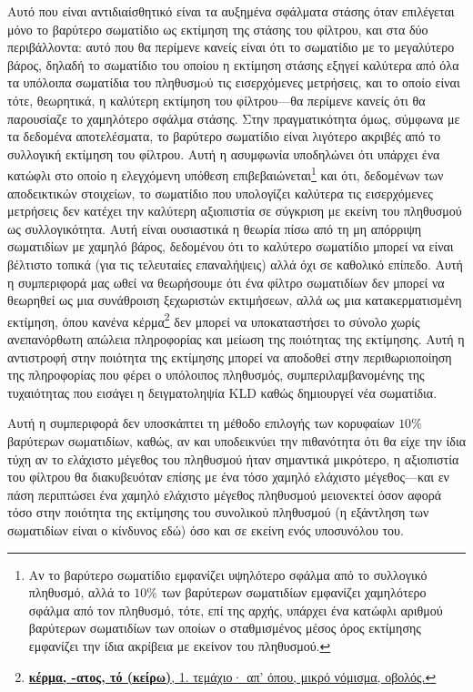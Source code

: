 Αυτό που είναι αντιδιαίσθητικό είναι τα αυξημένα σφάλματα στάσης όταν
επιλέγεται μόνο το βαρύτερο σωματίδιο ως εκτίμηση της στάσης του φίλτρου, και
στα δύο περιβάλλοντα: αυτό που θα περίμενε κανείς είναι ότι το σωματίδιο με το
μεγαλύτερο βάρος, δηλαδή το σωματίδιο του οποίου η εκτίμηση στάσης εξηγεί
καλύτερα από όλα τα υπόλοιπα σωματίδια του πληθυσμoύ τις εισερχόμενες
μετρήσεις, και το οποίο είναι τότε, θεωρητικά, η καλύτερη εκτίμηση του
φίλτρου---θα περίμενε κανείς ότι θα παρουσίαζε το χαμηλότερο σφάλμα στάσης.
Στην πραγματικότητα όμως, σύμφωνα με τα δεδομένα αποτελέσματα, το βαρύτερο
σωματίδιο είναι λιγότερο ακριβές από το συλλογική εκτίμηση του φίλτρου. Αυτή η
ασυμφωνία υποδηλώνει ότι υπάρχει ένα κατώφλι στο οποίο η ελεγχόμενη υπόθεση
επιβεβαιώνεται\footnote{Αν το βαρύτερο σωματίδιο εμφανίζει υψηλότερο σφάλμα από
το συλλογικό πληθυσμό, αλλά το $10\%$ των βαρύτερων σωματιδίων εμφανίζει
χαμηλότερο σφάλμα από τον πληθυσμό, τότε, επί της αρχής, υπάρχει ένα κατώφλι
αριθμού βαρύτερων σωματιδίων των οποίων ο σταθμισμένος μέσος όρος εκτίμησης
εμφανίζει την ίδια ακρίβεια με εκείνον του πληθυσμού.} και ότι, δεδομένων των
αποδεικτικών στοιχείων, το σωματίδιο που υπολογίζει καλύτερα τις εισερχόμενες
μετρήσεις δεν κατέχει την καλύτερη αξιοπιστία σε σύγκριση με εκείνη του
πληθυσμού ως συλλογικότητα. Αυτή είναι ουσιαστικά η θεωρία πίσω από τη μη
απόρριψη σωματιδίων με χαμηλό βάρος, δεδομένου ότι το καλύτερο σωματίδιο μπορεί
να είναι βέλτιστο τοπικά (για τις τελευταίες επαναλήψεις) αλλά όχι σε καθολικό
επίπεδο. Αυτή η συμπεριφορά μας ωθεί να θεωρήσουμε ότι ένα φίλτρο σωματιδίων
δεν μπορεί να θεωρηθεί ως μια συνάθροιση ξεχωριστών εκτιμήσεων, αλλά ως μια
κατακερματισμένη εκτίμηση, όπου κανένα
κέρμα\footnote{\href{https://www.greek-language.gr/digitalResources/ancient_greek/tools/liddell-scott/search.html?lq=\%CE\%BA\%CE\%AD\%CF\%81\%CE\%BC\%CE\%B1}
{\textbf{κέρμα, -ατος, τό (κείρω)}, 1.
τεμάχιο· απ' όπου, μικρό νόμισμα, οβολός.}} δεν μπορεί να υποκαταστήσει το
σύνολο χωρίς ανεπανόρθωτη απώλεια πληροφορίας και μείωση της ποιότητας της
εκτίμησης. Αυτή η αντιστροφή στην ποιότητα της εκτίμησης μπορεί να αποδοθεί
στην περιθωριοποίηση της πληροφορίας που φέρει ο υπόλοιπος πληθυσμός,
συμπεριλαμβανομένης της τυχαιότητας που εισάγει η δειγματοληψία KLD καθώς
δημιουργεί νέα σωματίδια.

Αυτή η συμπεριφορά δεν υποσκάπτει τη μέθοδο επιλογής των κορυφαίων $10\%$
βαρύτερων σωματιδίων, καθώς, αν και υποδεικνύει την πιθανότητα ότι θα είχε την
ίδια τύχη αν το ελάχιστο μέγεθος του πληθυσμού ήταν σημαντικά μικρότερο, η
αξιοπιστία του φίλτρου θα διακυβευόταν επίσης με ένα τόσο χαμηλό ελάχιστο
μέγεθος---και εν πάση περιπτώσει ένα χαμηλό ελάχιστο μέγεθος πληθυσμού
μειονεκτεί όσον αφορά τόσο στην ποιότητα της εκτίμησης του συνολικού πληθυσμού
(η εξάντληση των σωματιδίων είναι ο κίνδυνος εδώ) όσο και σε εκείνη ενός
υποσυνόλου του.


